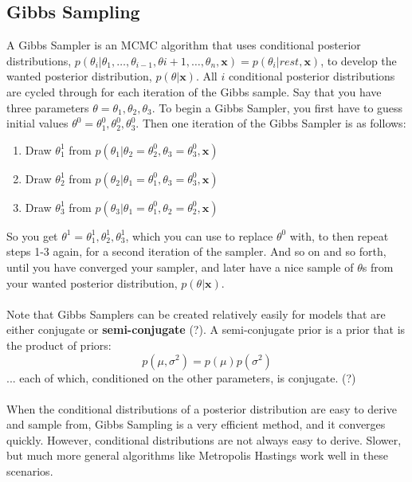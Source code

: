 \documentclass[12pt]{book}
\begin{document}
	\subsection{Gibbs Sampling}
	A Gibbs Sampler is an MCMC algorithm that uses conditional posterior distributions, $p(\theta_i|\theta_1,\dots, \theta_{i-1}, \theta{i+1},\dots, \theta_n, \textbf{x}) = p(\theta_i|rest, \textbf{x})$, to develop the wanted posterior distribution, $p(\theta|\textbf{x})$. All $i$ conditional posterior distributions are cycled through for each iteration of the Gibbs sample. 
	Say that you have three parameters $\theta = \theta_1, \theta_2, \theta_3$. To begin a Gibbs Sampler, you first have to guess initial values $\theta^0 = \theta^0_1, \theta^0_2, \theta^0_3$. Then one iteration of the Gibbs Sampler is as follows:
	\begin{enumerate}
	\item Draw $\theta_1^1$ from $p(\theta_1|\theta_2 = \theta_2^0, \theta_3 = \theta_3^0, \textbf{x})$
	\item Draw $\theta_2^1$ from $p(\theta_2|\theta_1 = \theta_1^0, \theta_3 = \theta_3^0, \textbf{x})$
	\item Draw $\theta_3^1$ from $p(\theta_3|\theta_1 = \theta_1^0, \theta_2 = \theta_2^0, \textbf{x})$
	\end{enumerate}
	So you get $\theta^1 = \theta^1_1, \theta^1_2, \theta^1_3$, which you can use to replace $\theta^0$ with, to then repeat steps 1-3 again, for a second iteration of the sampler. And so on and so forth, until you have converged your sampler, and later have a nice sample of $\theta$s from your wanted posterior distribution, $p(\theta|\textbf{x})$. 
	\\\\
	Note that Gibbs Samplers can be created relatively easily for models that are either conjugate or \textbf{semi-conjugate} (?). A semi-conjugate prior is a prior that is the product of priors:
	\begin{equation}
	p(\mu, \sigma^2) = p(\mu)p(\sigma^2)
	\end{equation}
	... each of which, conditioned on the other parameters, is conjugate. (?)
	\\\\
	When the conditional distributions of a posterior distribution are easy to derive and sample from, Gibbs Sampling is a very efficient method, and it converges quickly. However, conditional distributions are not always easy to derive. Slower, but much more general algorithms like Metropolis Hastings work well in these scenarios.
\end{document}
